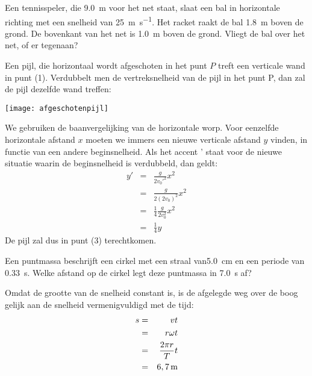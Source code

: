 \documentclass{ximera}
\begin{document}
\begin{exercise}
	Een tennisspeler, die \SI{9,0}{\meter} voor het net staat, slaat een bal in horizontale richting met een snelheid van \SI{25}{\meter\per\second}. Het racket raakt de bal \SI{1,8}{\meter} boven de grond. De bovenkant van het net is \SI{1,0}{\meter} boven de grond. Vliegt de bal over het net, of er tegenaan?
\end{exercise}

\begin{exercise}
	Een pijl, die horizontaal wordt afgeschoten in het punt $P$ treft een verticale wand in punt (1). Verdubbelt men de vertreksnelheid van de pijl in het punt P, dan zal de pijl dezelfde wand treffen:
	\newline

	\begin{minipage}{0.4\textwidth}
		\begin{multipleChoice}
		\end{multipleChoice}
	\end{minipage}
	\hfill
	\begin{minipage}{0.6\textwidth}
		\begin{image}
			\texttt{[image: afgeschotenpijl]}
		\end{image}
	\end{minipage}

\begin{oplossing}
	We gebruiken de baanvergelijking van de horizontale worp. Voor eenzelfde horizontale afstand $x$ moeten we immers een nieuwe verticale afstand $y$ vinden, in functie van een andere beginsnelheid. Als het accent ' staat voor de nieuwe situatie waarin de beginsnelheid is verdubbeld, dan geldt:
	\begin{eqnarray*}
		y'&=&\frac{g}{2v_0'^2}x^2\\
		&=&\frac{g}{2(2v_0)^2}x^2\\
		&=&\frac{1}{4}\frac{g}{2v_0^2}x^2\\
		&=&\frac{1}{4}y
	\end{eqnarray*}
	De pijl zal dus in punt (3) terechtkomen.
\end{oplossing}
\end{exercise}

\begin{exercise}
	Een puntmassa beschrijft een cirkel met een straal van\SI{5,0}{\centi\meter} en een periode van \SI{0,33}{\second}. Welke afstand op de cirkel legt deze puntmassa in \SI{7,0}{\second} af?
	\begin{oplossing}
		Omdat de grootte van de snelheid constant is, is de
		afgelegde weg over de boog gelijk aan de snelheid vermenigvuldigd met de tijd:
		\begin{eqnarray*}
			s&=&vt\\
			&=&r\omega t\\
			&=&\frac{2\pi r}{T}t\\
			&=&6,7\rm\,m
		\end{eqnarray*}
	\end{oplossing}
\end{exercise}
\end{document}
